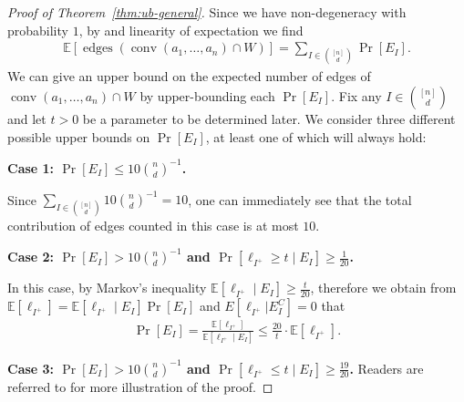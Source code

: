 \documentclass{theoretics}
\newcommand{\E}{\mathbb E}
\newcommand{\conv}{\operatorname{conv}}
\newcommand{\edges}{\operatorname{edges}}
\begin{document}
\begin{proof}[Proof of Theorem~\ref{thm:ub-general}]
    Since we have non-degeneracy with probability $1$, by  and linearity of expectation we find
    \begin{align*}
        \E\left[ \edges\left(\conv(a_1, \ldots, a_n) \cap W \right) \right] = \sum_{I \in \binom{[n]}{d}} \Pr[E_I].
    \end{align*}
    We can give an upper bound on the expected number of edges of $\conv(a_1, \ldots, a_n) \cap W$
    by upper-bounding each $\Pr[E_I]$.
    Fix any $I \in \binom{[n]}{d}$ and let $t > 0$ be a parameter to be determined later. 
    We consider three different possible upper bounds on $\Pr[E_I]$, at least one of which will always hold:
    
    {\bf Case 1: $\Pr[E_I] \leq 10\binom{n}{d}^{-1}$.} 
    
    Since $\sum_{I \in \binom{[n]}{d}}10 \binom{n}{d}^{-1} = 10$, one can immediately see that the total contribution of edges counted in this case is at most $10$.
    
    {\bf Case 2: $\Pr[E_I] > 10\binom{n}{d}^{-1}$ and $\Pr[\ell_{I^+} \geq t \mid E_I] \geq \frac{1}{20}$.} 
    
    In this case, by Markov's inequality $\E[\ell_{I^+} \mid E_I] \geq \frac{t}{20}$, therefore we obtain from $\mathbb{E}[\ell_{I^+}] = \mathbb{E}[\ell_{I^+}\mid E_I] \Pr[E_I]$ and $E[\ell_{I^{+}}| E_{I}^{C}] = 0$ that
    \begin{align*}
        \Pr[E_I] = \frac{\E[\ell_{I^+}]}{\E[\ell_{I^+} \mid E_I]} \leq \frac{20}{t} \cdot \E[\ell_{I^+}].
    \end{align*}
    
    {\bf Case 3: $\Pr[E_I] > 10 \binom{n}{d}^{-1}$ and $\Pr[\ell_{I^+} \leq t \mid E_I] \geq \frac{19}{20}$.}
    Readers are referred to  for more illustration of the proof.
    

\end{proof}
\end{document}
